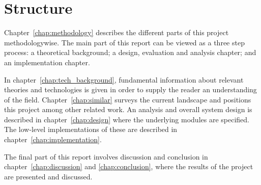 \section{Structure}
  \label{sec:structure}

Chapter~\ref{chap:methodology} describes the different parts of this project methodologywise. The main part of this report can be viewed as a three step process: a theoretical background; a design, evaluation and analysis chapter; and an implementation chapter.

In chapter~\ref{chap:tech_background}, fundamental information about relevant theories and technologies is given in order to supply the reader an understanding of the field. Chapter~\ref{chap:similar} surveys the current landscape and positions this project among other related work. An analysis and overall system design is described in chapter~\ref{chap:design} where the underlying modules are specified. The low-level implementations of these are described in chapter~\ref{chap:implementation}.

The final part of this report involves discussion and conclusion in chapter~\ref{chap:discussion} and \ref{chap:conclusion}, where the results of the project are presented and discussed.
